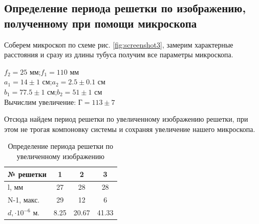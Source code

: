 \documentclass[a4paper, 12pt]{article}%
\begin{document}
	\subsection{Определение периода решетки по изображению, полученному при помощи микроскопа}
	Соберем микроскоп по схеме рис. \ref{fig:screenshot3}, замерим характерные расстояния и сразу из длины тубуса получим все параметры микроскопа.\\
	\begin{center}
		$f_2 = 25$ мм;$f_1 = 110$ мм\\
	
	$a_1 = 14\pm1$ см;$a_2 = 2.5\pm0.1$ см\\
	$b_1 = 77.5\pm1$ см;$b_2 = 51\pm1$ см\\
	Вычислим увеличение: Г$ = 113\pm7$\\
	\end{center}
	Отсюда найдем период решетки по увеличенному изображению решетки, при этом не трогая компоновку системы и сохраняя увеличение нашего микроскопа.
	\begin{table}[H]
		\centering
		\begin{tabular}{|l|c|c|c|}
			\hline
			№ решетки & 1    & 2     & 3     \\ \hline
			l, мм & 27   & 28    & 28    \\ \hline
			N-1, макс. & 29   & 12    & 6     \\ \hline
			$d, \cdot 10^{-6}$ м. & 8.25 & 20.67 & 41.33 \\ \hline
		\end{tabular}
	\caption{Определение периода решетки по увеличенному изображению}
	\end{table}
\end{document}

